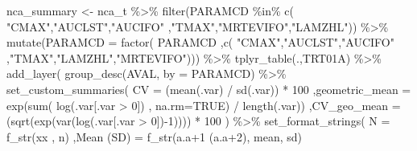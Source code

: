\documentclass[
  letterpaper,
  DIV=11,
  numbers=noendperiod]{scrreprt}
\newenvironment{Shaded}{\begin{snugshade}}{\end{snugshade}}
\newcommand{\AttributeTok}[1]{\textcolor[rgb]{0.40,0.45,0.13}{#1}}
\newcommand{\ConstantTok}[1]{\textcolor[rgb]{0.56,0.35,0.01}{#1}}
\newcommand{\DecValTok}[1]{\textcolor[rgb]{0.68,0.00,0.00}{#1}}
\newcommand{\FunctionTok}[1]{\textcolor[rgb]{0.28,0.35,0.67}{#1}}
\newcommand{\NormalTok}[1]{\textcolor[rgb]{0.00,0.23,0.31}{#1}}
\newcommand{\OtherTok}[1]{\textcolor[rgb]{0.00,0.23,0.31}{#1}}
\newcommand{\SpecialCharTok}[1]{\textcolor[rgb]{0.37,0.37,0.37}{#1}}
\newcommand{\StringTok}[1]{\textcolor[rgb]{0.13,0.47,0.30}{#1}}
\begin{document}
\begin{Shaded}
\begin{Highlighting}[]
\NormalTok{nca\_summary }\OtherTok{\textless{}{-}}\NormalTok{ nca\_t }\SpecialCharTok{\%\textgreater{}\%}
  \FunctionTok{filter}\NormalTok{(PARAMCD }\SpecialCharTok{\%in\%} \FunctionTok{c}\NormalTok{( }\StringTok{"CMAX"}\NormalTok{,}\StringTok{"AUCLST"}\NormalTok{,}\StringTok{"AUCIFO"}
\NormalTok{                        ,}\StringTok{"TMAX"}\NormalTok{,}\StringTok{"MRTEVIFO"}\NormalTok{,}\StringTok{"LAMZHL"}\NormalTok{)) }\SpecialCharTok{\%\textgreater{}\%}
  \FunctionTok{mutate}\NormalTok{(}\AttributeTok{PARAMCD =} \FunctionTok{factor}\NormalTok{( PARAMCD}
\NormalTok{                          ,}\FunctionTok{c}\NormalTok{( }\StringTok{"CMAX"}\NormalTok{,}\StringTok{"AUCLST"}\NormalTok{,}\StringTok{"AUCIFO"}
\NormalTok{                             ,}\StringTok{"TMAX"}\NormalTok{,}\StringTok{"LAMZHL"}\NormalTok{,}\StringTok{"MRTEVIFO"}\NormalTok{))) }\SpecialCharTok{\%\textgreater{}\%}
  \FunctionTok{tplyr\_table}\NormalTok{(.,TRT01A) }\SpecialCharTok{\%\textgreater{}\%}
    \FunctionTok{add\_layer}\NormalTok{(}
      \FunctionTok{group\_desc}\NormalTok{(AVAL, }\AttributeTok{by =}\NormalTok{ PARAMCD) }\SpecialCharTok{\%\textgreater{}\%} 
        \FunctionTok{set\_custom\_summaries}\NormalTok{(}
          \AttributeTok{CV =}\NormalTok{ (}\FunctionTok{mean}\NormalTok{(.var) }\SpecialCharTok{/} \FunctionTok{sd}\NormalTok{(.var)) }\SpecialCharTok{*} \DecValTok{100}
\NormalTok{         ,}\AttributeTok{geometric\_mean =} \FunctionTok{exp}\NormalTok{(}\FunctionTok{sum}\NormalTok{( }\FunctionTok{log}\NormalTok{(.var[.var }\SpecialCharTok{\textgreater{}} \DecValTok{0}\NormalTok{])}
\NormalTok{                                   , }\AttributeTok{na.rm=}\ConstantTok{TRUE}\NormalTok{) }\SpecialCharTok{/} \FunctionTok{length}\NormalTok{(.var))}
\NormalTok{         ,}\AttributeTok{CV\_geo\_mean =}\NormalTok{ (}\FunctionTok{sqrt}\NormalTok{(}\FunctionTok{exp}\NormalTok{(}\FunctionTok{var}\NormalTok{(}\FunctionTok{log}\NormalTok{(.var[.var }\SpecialCharTok{\textgreater{}} \DecValTok{0}\NormalTok{])}\SpecialCharTok{{-}}\DecValTok{1}\NormalTok{)))) }\SpecialCharTok{*} \DecValTok{100}
\NormalTok{        ) }\SpecialCharTok{\%\textgreater{}\%}
        \FunctionTok{set\_format\_strings}\NormalTok{(}
           \StringTok{\textquotesingle{}N\textquotesingle{}}            \OtherTok{=} \FunctionTok{f\_str}\NormalTok{(}\StringTok{\textquotesingle{}xx\textquotesingle{}}\NormalTok{   , n)}
\NormalTok{          ,}\StringTok{\textquotesingle{}Mean (SD)\textquotesingle{}}    \OtherTok{=} \FunctionTok{f\_str}\NormalTok{(}\StringTok{\textquotesingle{}a.a+1 (a.a+2)\textquotesingle{}}\NormalTok{, mean, sd)}

\end{Highlighting}
\end{Shaded}
\end{document}
